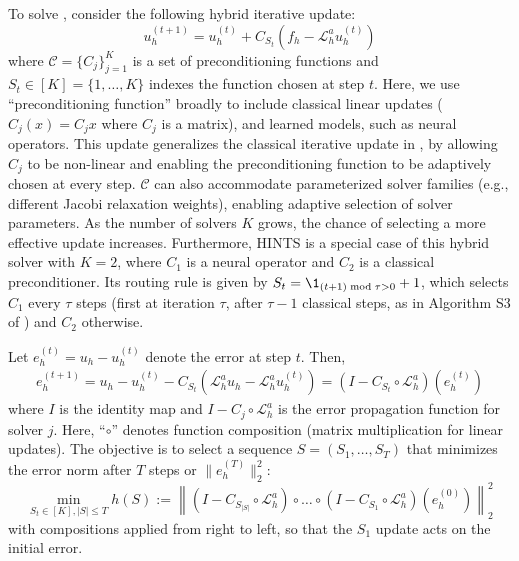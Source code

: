 \documentclass{article}
\newcommand{\edit}[1]{{\color{red}#1}}
\begin{document}
To solve , consider the following hybrid iterative update:
\begin{equation}
     u^{\left(t + 1\right)}_h = u^{\left(t\right)}_h + C_{S_t}\left(f_h - \mathcal{L}_h^au^{\left(t \right)}_h\right)
\end{equation}
where $\mathcal{C} =\{C_{j}\}_{j = 1}^K$ is a set of preconditioning functions and $S_t \in [K] = \{1, \dots, K\}$ indexes the function chosen at step $t$. Here, we use ``preconditioning function'' broadly to include classical linear updates ($C_j(x) = C_jx$ where $C_j$ is a matrix), and learned models, such as neural operators. 
This update generalizes the classical iterative update in , by allowing $C_j$ to be non-linear and enabling the preconditioning function to be adaptively chosen at every step. $\mathcal{C}$ can also accommodate parameterized solver families (e.g., different Jacobi relaxation weights), enabling adaptive selection of solver parameters.  As the number of solvers $K$ grows, the chance of selecting a more effective update increases. Furthermore, HINTS \citep{zhang2024blending} is a special case of this hybrid solver with $K = 2$, where  $C_1$ is a neural operator and $C_2$ is a classical preconditioner. Its routing rule is given by \edit{$S_t = \1_{(t + 1) \bmod \tau > 0} + 1$}, which selects $C_1$ every $\tau$ steps (\edit{first at iteration $\tau$, after $\tau - 1$ classical steps, as in Algorithm S3 of \citet{zhang2024blending}}) and $C_2$ otherwise.

Let $e^{(t)}_h = u_h - u^{(t)}_h$ denote the error at step $t$. Then, 
\begin{align*}
    e^{(t + 1)}_h = u_h -  u^{(t)}_h -C_{S_t}\left(\mathcal{L}_h^au_h - \mathcal{L}_h^au^{\left(t\right)}_h\right) = \left(I- C_{S_t} \circ \mathcal{L}_h^a\right)(e^{(t)}_h)
\end{align*}
where $I$ is the identity map and $I - C_{j} \circ\mathcal{L}_h^a$ is the error propagation function for solver $j$. Here, ``$\circ$'' denotes function composition (matrix multiplication for linear updates).
The objective is to select a sequence $S = (S_1, \dots, S_T)$ that minimizes the error norm after $T$ steps or $\|e^{(T)}_h\|_2^2$:
\begin{equation} \label{eq:errorobjective}
    \min_{S_t \in [K], |S| \leq T} h(S) := \left\|\left(I - C_{S_{|S|}} \circ \mathcal{L}_h^a\right) \circ \dots \circ \left(I - C_{S_1} \circ \mathcal{L}_h^a\right)  \left(e^{(0)}_h \right)\right\|^2_2
\end{equation}
with compositions applied from right to left, so that the $S_1$ update acts on the initial error.
\end{document}

